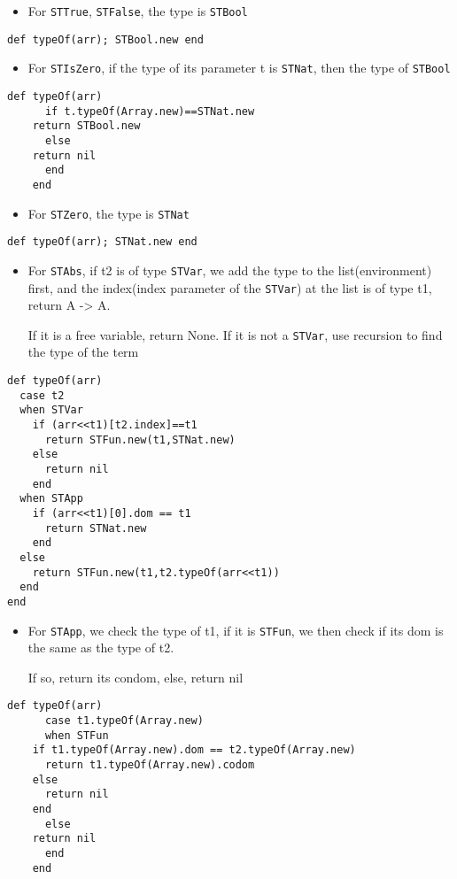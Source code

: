\documentclass[11pt]{article}
\begin{document}
\begin{itemize}
\item For \texttt{STTrue}, \texttt{STFalse}, the type is \texttt{STBool}
\end{itemize}
\begin{verbatim}
def typeOf(arr); STBool.new end
\end{verbatim}

\begin{itemize}
\item For \texttt{STIsZero}, if the type of its parameter t is \texttt{STNat}, then the type of \texttt{STBool}
\end{itemize}
\begin{verbatim}
def typeOf(arr)
      if t.typeOf(Array.new)==STNat.new
	return STBool.new
      else 
	return nil
      end  
    end
\end{verbatim}

\begin{itemize}
\item For \texttt{STZero}, the type is \texttt{STNat}
\end{itemize}
\begin{verbatim}
def typeOf(arr); STNat.new end
\end{verbatim}

\begin{itemize}
\item For \texttt{STAbs}, if t2 is of type \texttt{STVar}, we add the type to the list(environment) first, and the index(index parameter of the \texttt{STVar}) at the list is of type t1, return A -> A.

If it is a free variable, return None. If it is not a \texttt{STVar}, use recursion to find the type of the term
\end{itemize}
\begin{verbatim}
def typeOf(arr)
  case t2
  when STVar
    if (arr<<t1)[t2.index]==t1
      return STFun.new(t1,STNat.new)
    else 
      return nil
    end
  when STApp
    if (arr<<t1)[0].dom == t1
      return STNat.new
    end
  else 
    return STFun.new(t1,t2.typeOf(arr<<t1))
  end
end
\end{verbatim}

\begin{itemize}
\item For \texttt{STApp}, we check the type of t1, if it is \texttt{STFun}, we then check if its dom is the same as the type of t2.

If so, return its condom, else, return nil
\end{itemize}
\begin{verbatim}
def typeOf(arr)
      case t1.typeOf(Array.new)
      when STFun
	if t1.typeOf(Array.new).dom == t2.typeOf(Array.new)
	  return t1.typeOf(Array.new).codom
	else
	  return nil
	end
      else 
	return nil
      end
    end
\end{verbatim}
\end{document}
